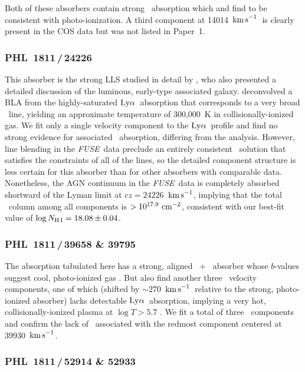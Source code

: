 \documentclass[twocolumn,twocolappendix,tighten,times]{aastex6}
\newcommand{\HI}{\ion{H}{1}}
\newcommand{\OVI}{\ion{O}{6}}
\newcommand{\fuse}{{\sl FUSE}}
\newcommand{\kms}{\ensuremath{{\rm km\,s}^{-1}}}
\newcommand{\lya}{\ensuremath{{\rm Ly}\alpha}}
\begin{document}
Both of these absorbers contain strong \OVI\ absorption which
\citet{savage02} and \citet{savage14} find to be consistent with
photo-ionization. A third component at 14014~\kms\ is clearly present
in the COS data but was not listed in Paper~1.


\subsubsection{PHL~1811\,/\,24226}
\label{indiv:absorbers:phl1811_24226}

This absorber is the strong LLS studied in detail by
\citet{jenkins03}, who also presented a detailed discussion of the luminous, 
early-type associated galaxy. \citet{savage14} deconvolved a BLA from the
highly-saturated \lya\ absorption that corresponds to a very broad
\OVI\ line, yielding an approximate temperature of 300,000~K in
collisionally-ionized gas. We fit only a single velocity component
to the \lya\ profile and find no strong evidence for associated 
\OVI\ absorption, differing from the \citet{savage14} analysis. 
However, line blending in the \fuse\ data preclude an entirely 
consistent \HI\ solution that satisfies the constraints of all of 
the lines, so the detailed component structure is less certain for 
this absorber than for other absorbers with comparable data. 
Nonetheless, the AGN continuum in the \fuse\ data is completely absorbed 
shortward of the Lyman limit at $cz=24226$~\kms, implying that the 
total \HI\ column among all components is $>10^{17.9}~{\rm cm}^{-2}$, 
consistent with our best-fit value of $\log{N_{\rm H\,I}}=18.08\pm0.04$.


\subsubsection{PHL~1811\,/\,39658 \& 39795}
\label{indiv:absorbers:phl1811_39658}

The absorption tabulated here has a strong, aligned \HI\ +
\OVI\ absorber whose $b$-values suggest cool, photo-ionized gas
\citep{savage14}. But \citet{savage14} also find another three
\OVI\ velocity components, one of which (shifted by
$\sim270$~\kms\ relative to the strong, photo-ionized absorber) lacks
detectable \lya\ absorption, implying a very hot, collisionally-ionized
plasma at $\log{T} > 5.7$ \citep{stocke14}. We fit a total of three \OVI\ 
components and confirm the lack of \HI\ associated with the redmost 
component centered at 39930~\kms.


\subsubsection{PHL~1811\,/\,52914 \& 52933}
\label{indiv:absorbers:phl1811_52914}
\end{document}
